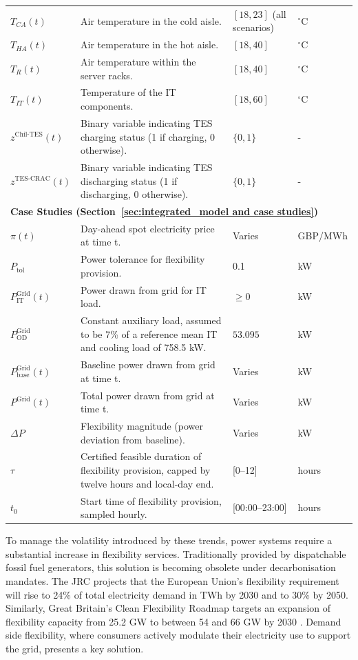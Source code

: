 \documentclass[lettersize,journal]{IEEEtran}
\providecommand{\DIFadd}[1]{{\color{blue}#1}}
\providecommand{\DIFaddbegin}{}
\providecommand{\DIFaddend}{}
\begin{document}
{{\begin{longtable}{p{} p{} p{} p{}}
$T_{CA}(t)$ & Air temperature in the cold aisle. & $[18, 23]$ (all scenarios) & $^{\circ}$C \\
$T_{HA}(t)$ & Air temperature in the hot aisle. & $[18, 40]$ & $^{\circ}$C \\
$T_{R}(t)$ & Air temperature within the server racks. & $[18, 40]$ & $^{\circ}$C \\
$T_{IT}(t)$ & Temperature of the IT components. & $[18, 60]$ & $^{\circ}$C \\
$z^{\mathrm{Chil}\text{-}\mathrm{TES}}(t)$ & Binary variable indicating TES charging status (1 if charging, 0 otherwise). & $\{0, 1\}$ & - \\
$z^{\mathrm{TES}\text{-}\mathrm{CRAC}}(t)$ & Binary variable indicating TES discharging status (1 if discharging, 0 otherwise). & $\{0, 1\}$ & - \\

\midrule
\multicolumn{4}{l}{\textbf{Case Studies (Section~\ref{sec:integrated_model and case studies})}} \\
\midrule
$\pi(t)$ & Day-ahead spot electricity price at time t. & Varies & GBP/MWh \\
$P_{\mathrm{tol}}$ & Power tolerance for flexibility provision. & 0.1 &kW \\
$P^{\mathrm{Grid}}_{\mathrm{IT}}(t)$ & Power drawn from grid for IT load. & $\geq 0$ &kW \\
$P^{\mathrm{Grid}}_{\mathrm{OD}}$ & Constant auxiliary load, assumed to be 7\% of a reference mean IT and cooling load of 758.5 kW. & $53.095$ &kW \\
$P^{\mathrm{Grid}}_{\mathrm{base}}(t)$ & Baseline power drawn from grid at time t. & Varies &kW \\
$P^{\mathrm{Grid}}(t)$ & Total power drawn from grid at time t. & Varies &kW \\
$\Delta P$ & Flexibility magnitude (power deviation from baseline). & Varies &kW \\
$\tau$ & Certified feasible duration of flexibility provision, capped by twelve hours and local-day end. & [0--12] & hours \\
$t_0$ & Start time of flexibility provision, sampled hourly. & [00:00--23:00] & hours \\
\end{longtable}
\twocolumn
}
 
} \DIFaddend 
To manage the volatility introduced by these trends, power systems require a substantial increase in flexibility services. Traditionally provided by dispatchable fossil fuel generators, this solution is becoming obsolete under decarbonisation mandates. The JRC \cite{koolen2023flexibility} projects that the European Union’s flexibility requirement will rise to 24\% of total electricity demand in TWh by 2030 and to 30\% by 2050. Similarly, Great Britain’s Clean Flexibility Roadmap targets an expansion of flexibility capacity from 25.2 GW to between 54  \DIFaddbegin \DIFadd{and }\DIFaddend 66 GW by 2030 \cite{clean_flexibility_roadmap}.  \DIFaddbegin \DIFadd{Demand side }\DIFaddend flexibility, where consumers actively modulate their electricity use to support the grid, presents a key solution.
\end{document}

